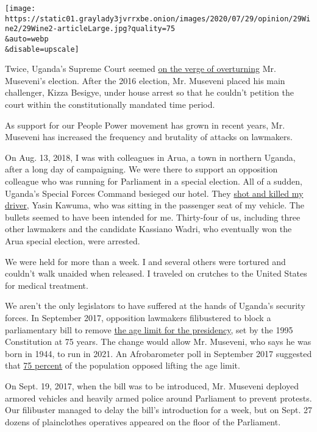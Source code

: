 \texttt{[image: https://static01.graylady3jvrrxbe.onion/images/2020/07/29/opinion/29Wine2/29Wine2-articleLarge.jpg?quality=75\\\&auto=webp\\\&disable=upscale]}

Twice, Uganda's Supreme Court seemed
\href{https://allafrica.com/stories/200105090061.html}{on the verge of
overturning} Mr. Museveni's election. After the 2016 election, Mr.
Museveni placed his main challenger, Kizza Besigye, under house arrest
so that he couldn't petition the court within the constitutionally
mandated time period.

As support for our People Power movement has grown in recent years, Mr.
Museveni has increased the frequency and brutality of attacks on
lawmakers.

On Aug. 13, 2018, I was with colleagues in Arua, a town in northern
Uganda, after a long day of campaigning. We were there to support an
opposition colleague who was running for Parliament in a special
election. All of a sudden, Uganda's Special Forces Command besieged our
hotel. They
\href{https://www.amnesty.org/en/latest/news/2018/08/uganda-investigate-death-of-opposition-politicians-driver/}{shot
and killed my driver,} Yasin Kawuma, who was sitting in the passenger
seat of my vehicle. The bullets seemed to have been intended for me.
Thirty-four of us, including three other lawmakers and the candidate
Kassiano Wadri, who eventually won the Arua special election, were
arrested.

We were held for more than a week. I and several others were tortured
and couldn't walk unaided when released. I traveled on crutches to the
United States for medical treatment.

We aren't the only legislators to have suffered at the hands of Uganda's
security forces. In September 2017, opposition lawmakers filibustered to
block a parliamentary bill to remove
\href{https://www.aljazeera.com/news/2017/09/uganda-introduces-bill-remove-presidential-age-limit-170927172204813.html}{the
age limit for the presidency}, set by the 1995 Constitution at 75 years.
The change would allow Mr. Museveni, who says he was born in 1944, to
run in 2021. An Afrobarometer poll in September 2017 suggested that
\href{https://www.nytimes3xbfgragh.onion/2017/12/20/world/africa/uganda-president-museveni-age-limit.html}{75
percent} of the population opposed lifting the age limit.

On Sept. 19, 2017, when the bill was to be introduced, Mr. Museveni
deployed armored vehicles and heavily armed police around Parliament to
prevent protests. Our filibuster managed to delay the bill's
introduction for a week, but on Sept. 27 dozens of plainclothes
operatives appeared on the floor of the Parliament.

